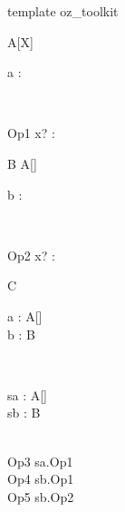\begin{zsection}
  \SECTION template \parents oz\_toolkit
\end{zsection}

\begin{class}{A[X]}
  \begin{state}
    a : \nat
  \end{state}\\
  \begin{op}{Op1}
    x? : \nat
  \end{op}
\end{class}

\begin{class}{B}
  \inherits A[\nat]\\
  \begin{state}
    b : \power \nat
  \end{state}\\
  \begin{op}{Op2}
    x? : \power \nat
  \end{op}
\end{class}

\begin{class}{C}
  \begin{axdef}
    a : \poly A[\nat]\\
    b : B
  \end{axdef}\\
  \begin{state}
    sa : \poly A[\nat]\\
    sb : B
  \end{state}\\
  Op3 \sdef sa.Op1\\
  Op4 \sdef sb.Op1\\
  Op5 \sdef sb.Op2
\end{class}
